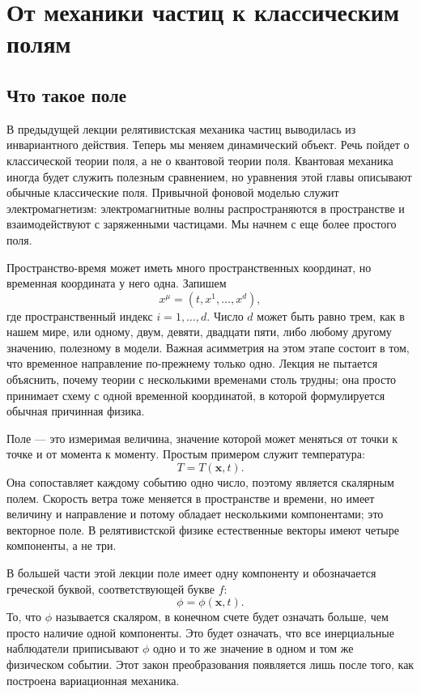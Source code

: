 \chapter{От механики частиц к классическим полям}

\section{Что такое поле}

В предыдущей лекции релятивистская механика частиц выводилась из инвариантного действия. Теперь мы меняем динамический объект. Речь пойдет о классической теории поля, а не о квантовой теории поля. Квантовая механика иногда будет служить полезным сравнением, но уравнения этой главы описывают обычные классические поля. Привычной фоновой моделью служит электромагнетизм: электромагнитные волны распространяются в пространстве и взаимодействуют с заряженными частицами. Мы начнем с еще более простого поля.

Пространство-время может иметь много пространственных координат, но временная координата у него одна. Запишем
\begin{equation}
x^\mu=(t,x^1,\ldots,x^d),
\end{equation}
где пространственный индекс \(i=1,\ldots,d\). Число \(d\) может быть равно трем, как в нашем мире, или одному, двум, девяти, двадцати пяти, либо любому другому значению, полезному в модели. Важная асимметрия на этом этапе состоит в том, что временное направление по-прежнему только одно. Лекция не пытается объяснить, почему теории с несколькими временами столь трудны; она просто принимает схему с одной временной координатой, в которой формулируется обычная причинная физика.

Поле — это измеримая величина, значение которой может меняться от точки к точке и от момента к моменту. Простым примером служит температура:
\begin{equation}
T=T(\mathbf{x},t).
\end{equation}
Она сопоставляет каждому событию одно число, поэтому является скалярным полем. Скорость ветра тоже меняется в пространстве и времени, но имеет величину и направление и потому обладает несколькими компонентами; это векторное поле. В релятивистской физике естественные векторы имеют четыре компоненты, а не три.

В большей части этой лекции поле имеет одну компоненту и обозначается греческой буквой, соответствующей букве \(f\):
\begin{equation}
\phi=\phi(\mathbf{x},t).
\label{eq:sr4-field-definition}
\end{equation}
То, что \(\phi\) называется скаляром, в конечном счете будет означать больше, чем просто наличие одной компоненты. Это будет означать, что все инерциальные наблюдатели приписывают \(\phi\) одно и то же значение в одном и том же физическом событии. Этот закон преобразования появляется лишь после того, как построена вариационная механика.

